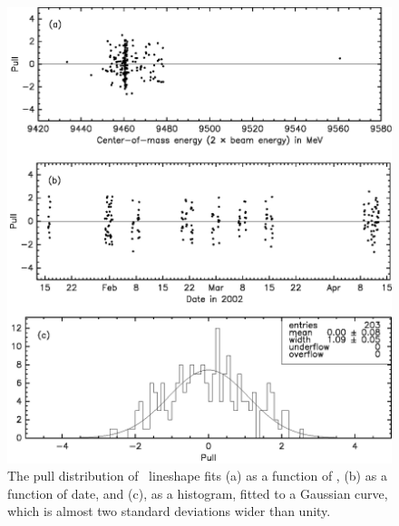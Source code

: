 \documentclass{cornell}
\begin{document}
\begin{figure}[p]
  \begin{center}
    \includegraphics[width=\linewidth]{pullsone}
  \end{center}
  \caption[Pull distributions for \us]{\label{pullsone} The pull distribution of \us\ lineshape
  fits (a) as a function of \ecm, (b) as a function of date, and (c),
  as a histogram, fitted to a Gaussian curve, which is almost two
  standard deviations wider than unity.}
\end{figure}
\end{document}
